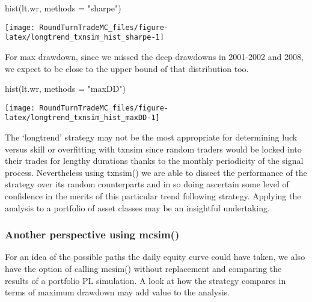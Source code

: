 \begin{Schunk}
\begin{Sinput}
hist(lt.wr, methods = "sharpe")
\end{Sinput}


\begin{center}\texttt{[image: RoundTurnTradeMC\_files/figure-latex/longtrend\_txnsim\_hist\_sharpe-1]} \end{center}

\end{Schunk}

For max drawdown, since we missed the deep drawdowns in 2001-2002 and
2008, we expect to be close to the upper bound of that distribution too.

\begin{Schunk}
\begin{Sinput}
hist(lt.wr, methods = "maxDD")
\end{Sinput}


\begin{center}\texttt{[image: RoundTurnTradeMC\_files/figure-latex/longtrend\_txnsim\_hist\_maxDD-1]} \end{center}

\end{Schunk}

The `longtrend' strategy may not be the most appropriate for determining
luck versus skill or overfitting with txnsim since random traders would
be locked into their trades for lengthy durations thanks to the monthly
periodicity of the signal process. Nevertheless using txnsim() we are
able to dissect the performance of the strategy over its random
counterparts and in so doing ascertain some level of confidence in the
merits of this particular trend following strategy. Applying the
analysis to a portfolio of asset classes may be an insightful
undertaking.

\hypertarget{another-perspective-using-mcsim}{%
\subsubsection{Another perspective using
mcsim()}\label{another-perspective-using-mcsim}}

For an idea of the possible paths the daily equity curve could have
taken, we also have the option of calling mcsim() without replacement
and comparing the results of a portfolio PL simulation. A look at how
the strategy compares in terms of maximum drawdown may add value to the
analysis.

